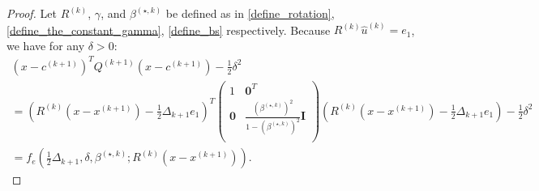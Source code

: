 \documentclass{article}
\theoremstyle{case}
\numberwithin{theorem}{subsection}
\newcommand{\bs}{{\beta^{(\star, k)}}}
\newcommand{\ck}{{c^{(k)}}}
\newcommand{\dk}{\Delta_k}
\newcommand{\dkpo}{\Delta_{k+1}}
\newcommand{\huk}{{{\hat u}^{(k)}}}
\newcommand{\qk}{{Q^{(k)}}}
\newcommand{\rotk}{{R^{(k)}}}
\newcommand{\sdk}{{\delta_k}}
\newcommand{\xkpo}{{{x}^{(k+1)}}}
\newcommand{\xk}{{x^{(k)}}}
\newcommand{\qkpo}{{Q^{(k+1)}}}
\newcommand{\ckpo}{{c^{(k+1)}}}
\begin{document}
\begin{proof}
Let $\rotk$, $\gamma$, and $\bs$ be defined as in \cref{define_rotation}, \cref{define_the_constant_gamma}, \cref{define_bs} respectively.
Because $\rotk\huk = e_1$, we have for any $\delta > 0$:
\begin{align*}
\left(x - \ckpo\right)^T\qkpo\left(x - \ckpo\right) - \frac 1 2 \delta^2 \\
= \left(\rotk(x-\xkpo) - \frac 1 2 \dkpo e_1\right)^T\begin{pmatrix}
1 & \boldsymbol0^T \\
\boldsymbol 0 & \frac{\left(\bs\right)^2}{1 - \left(\bs\right)^2} \boldsymbol I \\
\end{pmatrix} \left(\rotk(x-\xkpo) - \frac 1 2 \dkpo e_1\right) - \frac 1 2 \delta^2 \\
= f_e\left(\frac 1 2 \dkpo, \delta, \bs; \rotk\left(x - \xkpo\right)\right).
\end{align*}




\end{proof}
\end{document}
